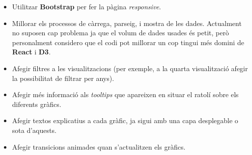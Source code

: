 \documentclass{article}
\begin{document}
\begin{itemize}
    \item Utilitzar \textbf{Bootstrap} per fer la pàgina \textit{responsive}.
    \item Millorar els processos de càrrega, parseig, i mostra de les dades.
        Actualment no suposen cap problema ja que el volum de dades usades és
        petit, però personalment considero que el codi pot millorar un cop
        tingui més domini de \textbf{React} i \textbf{D3}.
    \item Afegir filtres a les visualitzacions (per exemple, a la quarta
        visualització afegir la possibilitat de filtrar per anys).
    \item Afegir més informació als \textit{tooltips} que apareixen en situar
        el ratolí sobre els diferents gràfics.
    \item Afegir textos explicatius a cada gràfic, ja sigui amb una capa
        desplegable o sota d'aquests.
    \item Afegir transicions animades quan s'actualitzen els gràfics.
\end{itemize}
\end{document}
